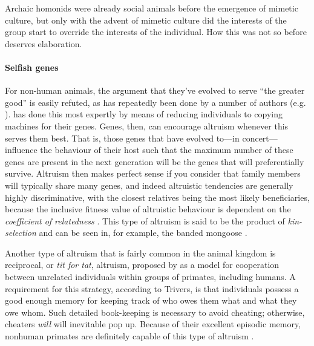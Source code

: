 \documentclass{article}
\begin{document}
Archaic homonids were already social animals before the emergence of mimetic
culture, but only with the advent of mimetic culture did the interests of the
group start to override the interests of the individual.  How this was not so
before deserves elaboration.

\paragraph{Selfish genes}


For non-human animals, the argument that they've evolved to serve “the greater
good” is easily refuted, as has repeatedly been done by a number of authors
(e.g. \citealp{hamilton1964, dawkins1976}). \citet{dawkins1976} has done this most expertly by
means of reducing individuals to copying machines for their genes. Genes, then,
can encourage altruism whenever this serves them best. That is, those genes
that have evolved to---in concert---influence the behaviour of their host such
that the maximum number of these genes are present in the next generation will
be the genes that will preferentially survive. Altruism then makes perfect
sense if you consider that family members will typically share many genes, and
indeed altruistic tendencies are generally highly discriminative, with the
closest relatives being the most likely beneficiaries, because the inclusive
fitness value of altruistic behaviour is dependent on the \textit{coefficient
of relatedness} \citep{hamilton1964}. This type of altruism is said to be the
product of \emph{kin-selection} and can be seen in, for example, the banded
mongoose \citep{gilchrist2004a, gilchrist2004b, hodge2005}.

Another type of altruism that is fairly common in the animal kingdom is
reciprocal, or \emph{tit for tat}, altruism, proposed by \citet{trivers1971}
as a model for cooperation between unrelated individuals within groups
of primates, including humans. A requirement for this strategy, according to
Trivers, is that individuals possess a good enough memory for keeping track of who
owes them what and what they owe whom. Such detailed book-keeping is necessary
to avoid cheating; otherwise, cheaters \textit{will} will inevitable pop up.
Because of their excellent episodic memory, nonhuman primates are definitely
capable of this type of altruism \citep{waal1996}.
\end{document}
